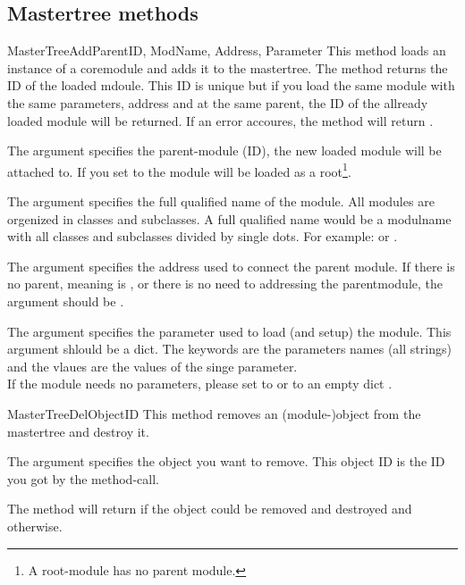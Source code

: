 \subsection{Mastertree methods}
\begin{methoddesc}[Core]{MasterTreeAdd}{ParentID, ModName, Address, Parameter}
This method loads an instance of a coremodule and adds it to the mastertree. 
The method returns the ID of the loaded mdoule. This ID is unique but if you 
load the same module with the same parameters, address and at the same parent, 
the ID of the allready loaded module will be returned. If an error accoures, 
the method will return .

The argument  specifies the parent-module (ID), the new loaded 
module will be attached to. If you set  to  the 
module will be loaded as a root\footnote{A root-module has no parent module.}. 

The argument  specifies the full qualified name of the module. 
All modules are orgenized in classes and subclasses. A full qualified name 
would be a modulname with all classes and subclasses divided by single dots. 
For example:  or .

The argument  specifies the address used to connect the parent 
module. If there is no parent, meaning  is , or there
is no need to addressing the parentmodule, the argument  should 
be .

The argument  specifies the parameter used to load (and setup) 
the module. This argument shlould be a dict.  The keywords are the parameters 
names (all strings) and the vlaues are the values of the singe parameter. \\ 
 If the module needs no parameters, 
please set  to  or to an empty dict \code{\{\}}.
\end{methoddesc}


\begin{methoddesc}[Core]{MasterTreeDel}{ObjectID}
This method removes an (module-)object from the mastertree and destroy it. 

The argument  specifies the object you want to remove. This 
object ID is the ID you got by the  method-call.

The method will return  if the object could be removed and destroyed 
and  otherwise.
\end{methoddesc}



